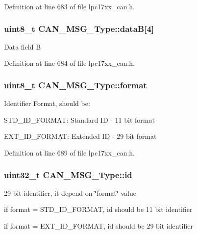 \-Definition at line 683 of file lpc17xx\-\_\-can.\-h.

\hypertarget{struct_c_a_n___m_s_g___type_a636a3396f3c986ebdd76090494a2c336}{
\subsubsection[{data\-B}]{\setlength{\rightskip}{0pt plus 5cm}uint8\-\_\-t {\bf \-C\-A\-N\-\_\-\-M\-S\-G\-\_\-\-Type\-::data\-B}\mbox{[}4\mbox{]}}}\label{struct_c_a_n___m_s_g___type_a636a3396f3c986ebdd76090494a2c336}
\-Data field \-B 

\-Definition at line 684 of file lpc17xx\-\_\-can.\-h.

\hypertarget{struct_c_a_n___m_s_g___type_a0800c2e8a71cb1de5fc426954adf1ec6}{
\subsubsection[{format}]{\setlength{\rightskip}{0pt plus 5cm}uint8\-\_\-t {\bf \-C\-A\-N\-\_\-\-M\-S\-G\-\_\-\-Type\-::format}}}\label{struct_c_a_n___m_s_g___type_a0800c2e8a71cb1de5fc426954adf1ec6}
\-Identifier \-Format, should be\-:
\begin{DoxyItemize}
\item \-S\-T\-D\-\_\-\-I\-D\-\_\-\-F\-O\-R\-M\-A\-T\-: \-Standard \-I\-D -\/ 11 bit format
\item \-E\-X\-T\-\_\-\-I\-D\-\_\-\-F\-O\-R\-M\-A\-T\-: \-Extended \-I\-D -\/ 29 bit format 
\end{DoxyItemize}

\-Definition at line 689 of file lpc17xx\-\_\-can.\-h.

\hypertarget{struct_c_a_n___m_s_g___type_a360b100656bd972200359eec9c047b90}{
\subsubsection[{id}]{\setlength{\rightskip}{0pt plus 5cm}uint32\-\_\-t {\bf \-C\-A\-N\-\_\-\-M\-S\-G\-\_\-\-Type\-::id}}}\label{struct_c_a_n___m_s_g___type_a360b100656bd972200359eec9c047b90}
29 bit identifier, it depend on \char`\"{}format\char`\"{} value
\begin{DoxyItemize}
\item if format = \-S\-T\-D\-\_\-\-I\-D\-\_\-\-F\-O\-R\-M\-A\-T, id should be 11 bit identifier
\item if format = \-E\-X\-T\-\_\-\-I\-D\-\_\-\-F\-O\-R\-M\-A\-T, id should be 29 bit identifier 
\end{DoxyItemize}

